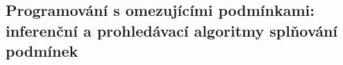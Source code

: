 \subsection{Programování s omezujícími podmínkami: inferenční a prohledávací algoritmy splňování podmínek}